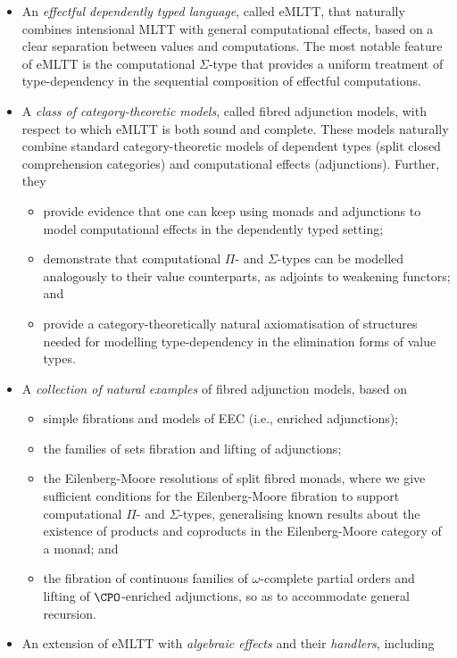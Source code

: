 \begin{itemize}
\item An \emph{effectful dependently typed language}, called eMLTT, that naturally combines intensional MLTT 
with general computational effects, based on a clear separation between values and computations. The most notable feature of eMLTT is the computational $\Sigma$-type that provides a uniform treatment of type-dependency in the sequential composition of effectful computations.
\item A \emph{class of category-theoretic models}, called fibred adjunction models, with respect to which eMLTT is both sound and complete. These models naturally combine standard category-theoretic models of dependent types (split closed comprehension categories) and computational effects (adjunctions). Further, they
\begin{itemize}
\item provide evidence that one can keep using monads and adjunctions to model computational effects in the dependently typed setting;
\item demonstrate that computational $\Pi$- and $\Sigma$-types can be modelled analogously to their value counterparts, as adjoints to weakening functors; and 
\item provide a category-theoretically natural axiomatisation of structures needed for modelling type-dependency in the elimination forms of value types. 
\end{itemize}
\item A \emph{collection of natural examples} of fibred adjunction models, based on
\begin{itemize}
\item simple fibrations and models of EEC (i.e., enriched adjunctions);  
\item the families of sets fibration and lifting of adjunctions; 
\item the Eilenberg-Moore resolutions of split fibred monads, where we 
give sufficient conditions for the Eilenberg-Moore fibration to support computational $\Pi$- and $\Sigma$-types, generalising known results about the existence of products and coproducts in the Eilenberg-Moore category of a monad; and
\item the fibration of continuous families of $\omega$-complete partial orders and lifting of $\CPO$-enriched adjunctions, so as to accommodate general recursion.
\end{itemize}
\item An extension of eMLTT with \emph{algebraic effects} and their \emph{handlers}, including

\end{itemize}

